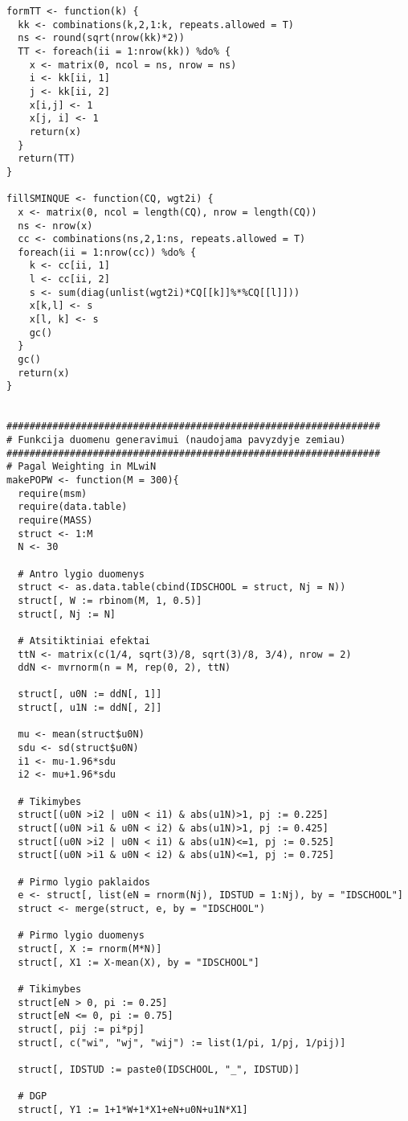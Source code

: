 \documentclass[11pt,a4paper]{article}
\begin{document}
\begin{appendix}
\begin{footnotesize}
\begin{verbatim}
formTT <- function(k) {
  kk <- combinations(k,2,1:k, repeats.allowed = T)
  ns <- round(sqrt(nrow(kk)*2))
  TT <- foreach(ii = 1:nrow(kk)) %do% {
    x <- matrix(0, ncol = ns, nrow = ns)
    i <- kk[ii, 1]
    j <- kk[ii, 2]
    x[i,j] <- 1
    x[j, i] <- 1
    return(x)
  }
  return(TT)
}

fillSMINQUE <- function(CQ, wgt2i) {
  x <- matrix(0, ncol = length(CQ), nrow = length(CQ))
  ns <- nrow(x)
  cc <- combinations(ns,2,1:ns, repeats.allowed = T)
  foreach(ii = 1:nrow(cc)) %do% {
    k <- cc[ii, 1]
    l <- cc[ii, 2]
    s <- sum(diag(unlist(wgt2i)*CQ[[k]]%*%CQ[[l]]))
    x[k,l] <- s
    x[l, k] <- s
    gc()
  }
  gc()
  return(x)
}


#################################################################
# Funkcija duomenu generavimui (naudojama pavyzdyje zemiau)
#################################################################
# Pagal Weighting in MLwiN
makePOPW <- function(M = 300){
  require(msm)
  require(data.table)
  require(MASS)
  struct <- 1:M
  N <- 30
  
  # Antro lygio duomenys
  struct <- as.data.table(cbind(IDSCHOOL = struct, Nj = N))
  struct[, W := rbinom(M, 1, 0.5)]
  struct[, Nj := N]
  
  # Atsitiktiniai efektai 
  ttN <- matrix(c(1/4, sqrt(3)/8, sqrt(3)/8, 3/4), nrow = 2)
  ddN <- mvrnorm(n = M, rep(0, 2), ttN)
  
  struct[, u0N := ddN[, 1]]
  struct[, u1N := ddN[, 2]]
  
  mu <- mean(struct$u0N)
  sdu <- sd(struct$u0N)
  i1 <- mu-1.96*sdu
  i2 <- mu+1.96*sdu
  
  # Tikimybes
  struct[(u0N >i2 | u0N < i1) & abs(u1N)>1, pj := 0.225]
  struct[(u0N >i1 & u0N < i2) & abs(u1N)>1, pj := 0.425]
  struct[(u0N >i2 | u0N < i1) & abs(u1N)<=1, pj := 0.525]
  struct[(u0N >i1 & u0N < i2) & abs(u1N)<=1, pj := 0.725]
  
  # Pirmo lygio paklaidos
  e <- struct[, list(eN = rnorm(Nj), IDSTUD = 1:Nj), by = "IDSCHOOL"]
  struct <- merge(struct, e, by = "IDSCHOOL")
  
  # Pirmo lygio duomenys
  struct[, X := rnorm(M*N)]
  struct[, X1 := X-mean(X), by = "IDSCHOOL"]
  
  # Tikimybes
  struct[eN > 0, pi := 0.25]
  struct[eN <= 0, pi := 0.75]
  struct[, pij := pi*pj]
  struct[, c("wi", "wj", "wij") := list(1/pi, 1/pj, 1/pij)]
  
  struct[, IDSTUD := paste0(IDSCHOOL, "_", IDSTUD)]
  
  # DGP
  struct[, Y1 := 1+1*W+1*X1+eN+u0N+u1N*X1]
  

\end{verbatim}
\end{footnotesize}
\end{appendix}
\end{document}
